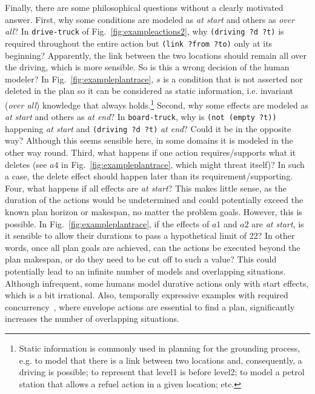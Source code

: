 \documentclass[10pt,journal,compsoc]{IEEEtran}
\begin{document}
Finally, there are some philosophical questions without a clearly motivated answer. First, why some conditions are modeled as \emph{at start} and others as \emph{over all}? In \texttt{drive-truck} of Fig.~\ref{fig:exampleactions2}, why \texttt{(driving ?d ?t)} is required throughout the entire action but \texttt{(link ?from ?to)} only at its beginning? Apparently, the link between the two locations should remain all over the driving, which is more sensible. So is this a wrong decision of the human modeler? In Fig.~\ref{fig:exampleplantrace}, $s$ is a condition that is not asserted nor deleted in the plan so it can be considered as static information, i.e. invariant (\emph{over all}) knowledge that always holds.\footnote{Static information is commonly used in planning for the grounding process, e.g. to model that there is a link between two locations and, consequently, a driving is possible; to represent that level1 is before level2; to model a petrol station that allows a refuel action in a given location; etc.} 
Second, why some effects are modeled as \emph{at start} and others as \emph{at end}? In \texttt{board-truck}, why is \texttt{(not (empty ?t))} happening \textit{at start} and \texttt{(driving ?d ?t)} \textit{at end}? Could it be in the opposite way? Although this seems sensible here, in some domains it is modeled in the other way round. Third, what happens if one action requires/supports what it deletes (see $a4$ in Fig.~\ref{fig:exampleplantrace}, which might threat itself)? In such a case, the delete effect should happen later than its requirement/supporting.
Four, what happens if all effects are \emph{at start}? This makes little sense, as the duration of the actions would be undetermined and could potentially exceed the known plan horizon or makespan, no matter the problem goals. However, this is possible. In Fig.~\ref{fig:exampleplantrace}, if the effects of $a1$ and $a2$ are \emph{at start}, is it sensible to allow their durations to pass a hypothetical limit of 22? In other words, once all plan goals are achieved, can the actions be executed beyond the plan makespan, or do they need to be cut off to such a value? This could potentially lead to an infinite number of models and overlapping situations. Although infrequent, some humans model durative actions only with start effects, which is a bit irrational. Also, temporally expressive examples with required concurrency~\cite{cushing2007temporal}, where envelope actions are essential to find a plan, significantly increases the number of overlapping situations.
\end{document}

